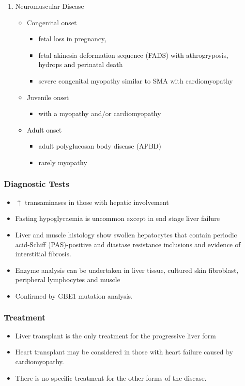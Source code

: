 \documentclass{scrartcl}
\begin{document}
\begin{enumerate}
\item Neuromuscular Disease
\label{sec:org59729e9}
\begin{itemize}
\item Congenital onset
\begin{itemize}
\item fetal loss in pregnancy,
\item fetal akinesia deformation sequence (FADS) with athrogryposis, hydrops and perinatal death
\item severe congenital myopathy similar to SMA with \textpm{} cardiomyopathy
\end{itemize}
\item Juvenile onset
\begin{itemize}
\item with a myopathy and/or cardiomyopathy
\end{itemize}
\item Adult onset
\begin{itemize}
\item adult polyglucosan body disease (APBD)
\item rarely myopathy
\end{itemize}
\end{itemize}
\end{enumerate}

\subsubsection{Diagnostic Tests}
\label{sec:org9dd0e9e}

\begin{itemize}
\item \(\uparrow\) transaminases in those with hepatic involvement
\item Fasting hypoglycaemia is uncommon except in end stage liver failure
\item Liver and muscle histology show swollen hepatocytes that contain
periodic acid-Schiff (PAS)-positive and diastase resistance
inclusions and evidence of interstitial fibrosis.
\item Enzyme analysis can be undertaken in liver tissue, cultured skin
fibroblast, peripheral lymphocytes and muscle
\item Confirmed by GBE1 mutation analysis.
\end{itemize}

\subsubsection{Treatment}
\label{sec:orgcb1003b}
\begin{itemize}
\item Liver transplant is the only treatment for the progressive liver form
\item Heart transplant may be considered in those with heart failure caused by cardiomyopathy.
\item There is no specific treatment for the other forms of the disease.
\end{itemize}
\end{document}
